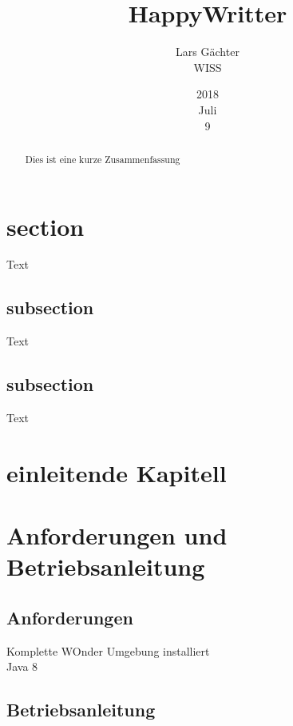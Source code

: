 \documentclass{article}
\title{HappyWritter}
\date{2018\\Juli\\9}
\author{Lars Gächter\\ WISS}
\begin{document}
\maketitle
\clearpage
\tableofcontents
\clearpage 
\begin{abstract}
Dies ist eine kurze Zusammenfassung
\end{abstract}

\section{section}
Text

\subsection{subsection}

Text

\subsection{subsection}

Text

\section{einleitende Kapitell}

\section{Anforderungen und Betriebsanleitung}
\subsection{Anforderungen}
Komplette WOnder Umgebung installiert\\
Java 8
\subsection{Betriebsanleitung}
\end{document}
